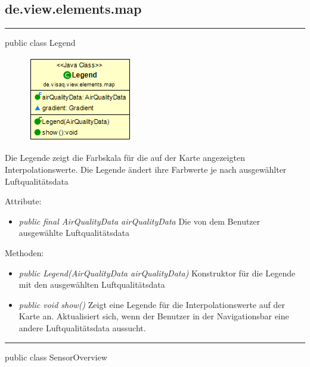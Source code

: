 \subsection{de.view.elements.map}

\rule{\textwidth}{0.4pt} 
public class Legend

\begin{minipage}{0.3\textwidth}
    \begin{figure}[H]
        \includegraphics[scale = 0.6]{media/frontend/view/de.view.elements.map/Legend_Class.png}
    \end{figure}
    \end{minipage} \hfill
    \begin{minipage}{0.6\textwidth}
Die Legende zeigt die Farbskala für die auf der Karte angezeigten Interpolationswerte. Die Legende ändert ihre Farbwerte je nach ausgewählter Luftqualitätsdata
\end{minipage}

Attribute:
\begin{itemize} 
    \item \emph{public final AirQualityData airQualityData} Die von dem Benutzer ausgewählte Luftqualitätsdata
\end{itemize} 
Methoden:
\begin{itemize}     
    \item \emph{public Legend(AirQualityData airQualityData)} Konstruktor für die Legende mit den ausgewählten Luftqualitätsdata
    \item \emph{public void show()} Zeigt eine Legende für die Interpolationswerte auf der Karte an. Aktualisiert sich, wenn der Benutzer in der Navigationsbar eine andere Luftqualitätsdata aussucht.
\end{itemize}

\rule{\textwidth}{0.4pt} 
public class SensorOverview

